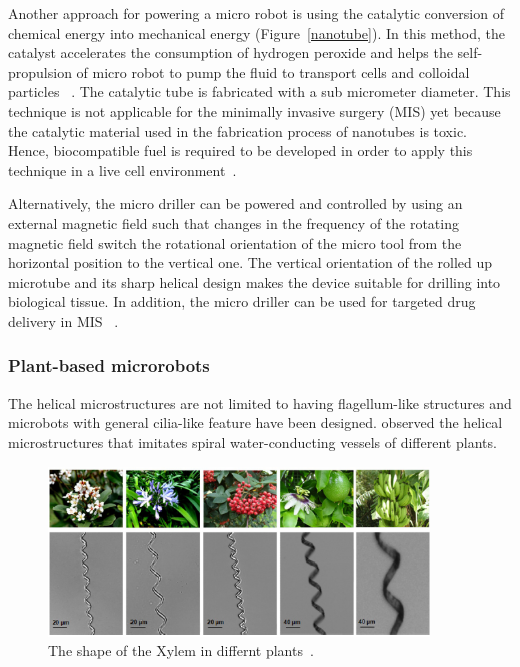\documentclass[12pt,a4paper,titlepage]{report}
\newcommand{\hilight}[1]{\colorbox{yellow}{#1}}
\begin{document}
Another approach for powering a micro robot is using the catalytic conversion of chemical energy
 into mechanical energy (Figure~\ref{nanotube}). In this method, the catalyst accelerates the consumption of hydrogen peroxide
 and helps the self-propulsion of micro robot to pump the fluid to transport cells and colloidal 
particles ~\citep{C2NR32798H}. The catalytic tube is fabricated with a sub micrometer diameter.
 This technique is not applicable for the minimally invasive surgery (MIS) yet because the catalytic
 material used in the fabrication process of nanotubes is toxic. Hence, biocompatible fuel is required to be developed in order to 
apply this technique in a live cell environment~\citep{C2NR32798H}.




Alternatively, the micro driller can be powered and controlled by using an external magnetic field 
such that changes in the frequency of the rotating magnetic field switch the rotational orientation of the 
micro tool from the horizontal position to the vertical one. The vertical orientation of the rolled up microtube 
and its sharp helical design makes the device suitable for drilling into biological tissue. In addition, the micro 
driller can be used for targeted drug delivery in MIS ~\citep{C2NR32798H}. 


\subsubsection{Plant-based microrobots}
The helical microstructures are not limited to having flagellum-like structures and microbots with
general cilia-like feature have been designed. \citeauthor{gao2013bioinspired}
 observed the helical microstructures that imitates spiral water-conducting vessels of different plants. 

\begin{figure}
  \centering
    \includegraphics[width=0.9\textwidth]{plants}
  \caption[Xylem\rq{}s shape in different plants ]{The shape of the Xylem in differnt plants~\citep{mahoney2011velocity}.}
  \label{plants}
\end{figure}
\end{document}

